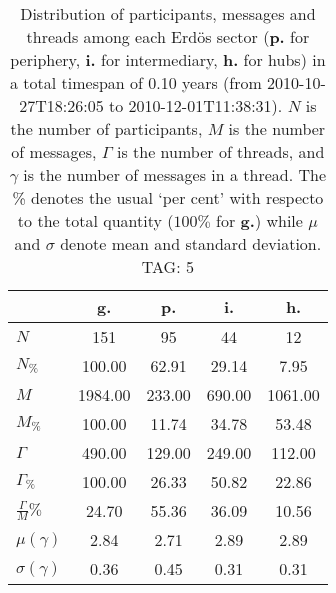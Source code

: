 \begin{table}[h!]
\begin{center}
\begin{tabular}{| l | c | c | c | c |}\hline
 & g. & p. & i. & h. \\\hline
$N$ & 151  & 95  & 44  & 12 \\\hline
$N_{\%}$ & 100.00  & 62.91  & 29.14  & 7.95 \\\hline
$M$ & 1984.00  & 233.00  & 690.00  & 1061.00 \\\hline
$M_{\%}$ & 100.00  & 11.74  & 34.78  & 53.48 \\\hline
$\Gamma$ & 490.00  & 129.00  & 249.00  & 112.00 \\\hline
$\Gamma_{\%}$ & 100.00  & 26.33  & 50.82  & 22.86 \\\hline
$\frac{\Gamma}{M}\%$ & 24.70  & 55.36  & 36.09  & 10.56 \\\hline
$\mu(\gamma)$ & 2.84  & 2.71  & 2.89  & 2.89 \\\hline
$\sigma(\gamma)$ & 0.36  & 0.45  & 0.31  & 0.31 \\\hline
\end{tabular}
\caption{Distribution of participants, messages and threads among each Erd\"os sector ({\bf p.} for periphery, {\bf i.} for intermediary, 
    {\bf h.} for hubs) in a total timespan of 0.10 years (from 2010-10-27T18:26:05 to 2010-12-01T11:38:31). $N$ is the number of participants, $M$ is the number of messages, $\Gamma$ is the number of threads, and $\gamma$ is the number of messages in a thread.
    The \% denotes the usual `per cent' with respecto to the total quantity ($100\%$ for {\bf g.})
    while $\mu$ and $\sigma$ denote mean and standard deviation. TAG: 5}
\end{center}
\end{table}